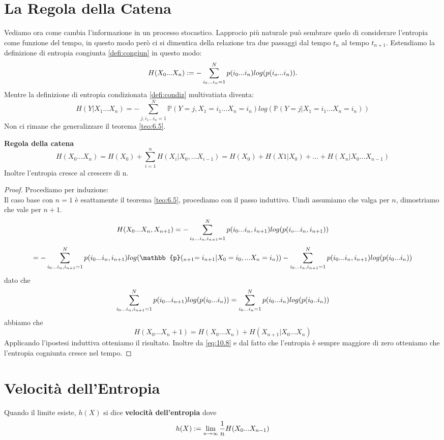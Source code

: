 \section{La Regola della Catena}
\label{sec:chainRule}
Vediamo ora come cambia l'informazione in un processo stocastico. Lapprocio più naturale può sembrare quelo di considerare l'entropia come funzione del tempo, in questo modo però ci si dimentica della relazione tra due passaggi dal tempo $t_n$ al tempo $t_{n+1}$. Estendiamo la definizione di entropia congiunta \ref{defi:congiun} in questo modo:
\begin{equation}
H(X_0...X_n):=- \sum_{i_0...i_n=1}^N p(i_0...i_n)log(p(i_o...i_n)).
\end{equation}
Mentre la definizione di entropia condizionata \ref{defi:condiz} multivatiata diventa:
\begin{equation}
H(Y|X_1...X_n)=-\sum_{j,i_1...i_n=1}^N \mathbb{P}(Y=j,X_1=i_1...X_n=i_n) log(\mathbb{P}(Y=j|X_1=i_1...X_n=i_n))
\end{equation}
Non ci rimane che generalizzare il teorema \ref{teo:6.5}.
\begin{teo}\textbf{Regola della catena}
\begin{equation}
H(X_0...X_n)=H(X_0)+\sum_{i=1}^n  H(X_i|X_0,...X_{i-1})=H(X_0)+H(X1|X_0)+...+H(X_n|X_0...X_{n-1})
\end{equation}
Inoltre l'entropia cresce al crescere di n.
\end{teo}
\begin{proof}
Procediamo per induzione:\\
Il caso base con $n=1$ è esattamente il teorema \ref{teo:6.5}, procediamo con il passo induttivo. Uindi assumiamo che valga per $n$, dimostriamo che vale per $n+1$.
$$H(X_0...X_n, X_{n+1})=- \sum_{i_0...i_n,i_{n+1}=1}^N p(i_0...i_n,i_{n+1})log(p(i_o...i_n,i_{n+1}))$$
$$= - \sumaa p(i_0...i_n,i_{n+1})log(\mathbb{p}(_{n+1}=i_{n+1}|X_0=i_0,...X_n=i_n))-\sumaa p(i_0...i_n,i_{n+1})log(p(i_0...i_n))$$
dato che 
$$\sum_{i_0...i_n,i_{n+1}=1}^N p(i_0...i_{n+1})log(p(i_0...i_n))=\sum_{i_0...i_n=1}^N p(i_0...i_{n})log(p(i_0..i_n))$$
abbiamo che
\begin{equation}\label{eq:10.8}
H(X_0...X_n+1)=H(X_0...X_n)+H(X_{n+1}|X_0...X_n)
\end{equation}
Applicando l'ipostesi induttiva otteniamo il risultato.
Inoltre da \ref{eq:10.8} e dal fatto che l'entropia è sempre maggiore di zero otteniamo che l'entropia cogniunta cresce nel tempo.
\end{proof}


\section{Velocità dell'Entropia}
\label{sec:EntropyRate}
\begin{defi}
Quando il limite esiste, $h(X)$ si dice \textbf{velocità dell'entropia} dove
$$h(X):=\lim_{n\to \infty}\frac{1}{n}H(X_0...X_{n-1})$$
\end{defi}

